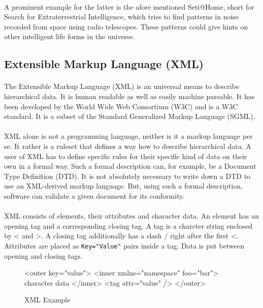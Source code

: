 \paragraph{}
A prominent example for the latter is the afore mentioned Seti@Home, short for Search for Extraterrestrial Intelligence, which tries to find patterns in noise recorded from space using radio telescopes. These patterns could give hints on other intelligent life forms in the universe.

\subsection{Extensible Markup Language (XML)}
\paragraph{}
The Extensible Markup Language (XML) is an universal means to describe hierarchical data. It is human readable as well as easily machine parsable. It has been developed by the World Wide Web Consortium (W3C) and is a W3C standard. It is a subset of the Standard Generalized Markup Language (SGML).

\paragraph{}
XML alone is not a programming language, neither is it a markup language per se. It rather is a ruleset that defines a way how to describe hierarchical data. A user of XML has to define specific rules for their specific kind of data on their own in a formal way. Such a formal description can, for example, be a Document Type Definition (DTD). It is not absolutely necessary to write down a DTD to use an XML-derived markup language. But, using such a formal description, software can validate a given document for its conformity.

\paragraph{}
XML consists of elements, their attributes and character data. An element has an opening tag and a corresponding closing tag. A tag is a charcter string enclosed by \glqq{}<\grqq{} and \glqq{}>\grqq{}. A closing tag additionally has a slash \glqq{}/\grqq{} right after the first \glqq{}<\grqq{}. Attributes are placed as \texttt{Key="Value"} pairs inside a tag. Data is put between opening and closing tags.

\begin{figure}[H]
\begin{listing}{1}
<outer key="value">
  <inner xmlns="namespace" foo="bar">
    character data
  </inner>
  <tag attr="value" />
</outer>
\end{listing}
\caption{XML Example}
\label{fig:XMLexample}
\end{figure}

